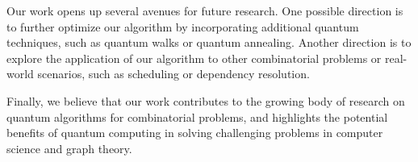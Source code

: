 Our work opens up several avenues for future research. One possible direction is to further optimize our algorithm by incorporating additional quantum techniques, such as quantum walks or quantum annealing. Another direction is to explore the application of our algorithm to other combinatorial problems or real-world scenarios, such as scheduling or dependency resolution.

Finally, we believe that our work contributes to the growing body of research on quantum algorithms for combinatorial problems, and highlights the potential benefits of quantum computing in solving challenging problems in computer science and graph theory.

